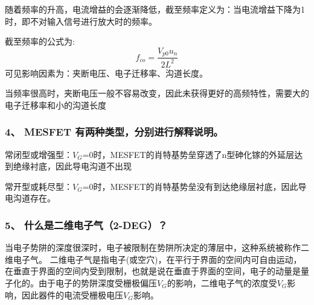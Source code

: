 \documentclass[cn,11pt]{elegantbook}
\begin{document}
随着频率的升高，电流增益的会逐渐降低，截至频率定义为：当电流增益下降为1时，即不对输入信号进行放大时的频率。

截至频率的公式为:$$f_{co}=\dfrac{V_{p0}u_{n}}{2L^{2}}$$
可见影响因素为：夹断电压、电子迁移率、沟道长度。

当频率很高时，夹断电压一般不容易改变，因此未获得更好的高频特性，需要大的电子迁移率和小的沟道长度
\subsubsection*{4、 MESFET 有两种类型，分别进行解释说明。}
常闭型或增强型：$V_{G}$=0时，MESFET的肖特基势垒穿透了n型砷化镓的外延层达到绝缘衬底，因此导电沟道不出现

常开型或耗尽型：$V_{G}$=0时，MESFET的肖特基势垒没有到达绝缘层衬底，因此导电沟道存在。
\subsubsection*{5、 什么是二维电子气（2-DEG）？}
当电子势阱的深度很深时，电子被限制在势阱所决定的薄层中，这种系统被称作二维电子气。
二维电子气是指电子(或空穴)，在平行于界面的空间内可自由运动，在垂直于界面的空间内受到限制，也就是说在垂直于界面的空间，电子的动量是量子化的。由于电子的势阱深度受栅极偏压$V_{G}$的影响，二维电子气的浓度受$V_{G}$影响，因此器件的电流受栅极电压$V_{G}$影响。
\end{document}
